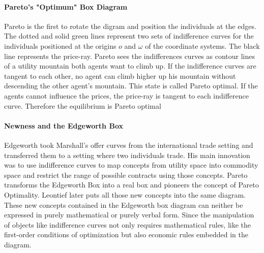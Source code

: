 \documentclass[12pt,a4paper]{article}
\begin{document}
\paragraph{Pareto’s "Optimum" Box Diagram}
Pareto is the first to rotate the digram and position the individuals at the edges. The dotted and solid green lines represent two sets of indifference curves for the individuals positioned at the origins $o$ and $\omega$ of the coordinate systems. The black line represents the price-ray.
Pareto sees the indifferences curves as contour lines of a utility mountain both agents want to climb up. If the indifference curves are tangent to each other, no agent can climb higher up his mountain without descending the other agent's mountain. This state is called Pareto optimal. If the agents cannot influence the prices, the price-ray is tangent to each indifference curve. Therefore the equilibrium is Pareto optimal


\paragraph{Newness and the Edgeworth Box}
Edgeworth took Marshall's offer curves from the international trade setting and transferred them to a setting where two individuals trade. His main innovation was to use indifference curves to map concepts from utility space into commodity space and restrict the range of possible contracts using those concepts.
Pareto transforms the Edgeworth Box into a real box and pioneers the concept of Pareto Optimality.
Leontief later puts all those new concepts into the same diagram.
These new concepts contained in the Edgeworth box diagram can neither be expressed in purely mathematical or purely verbal form. Since the manipulation of objects like indifference curves not only requires mathematical rules, like the first-order conditions of optimization but also economic rules embedded in the diagram.
\end{document}
